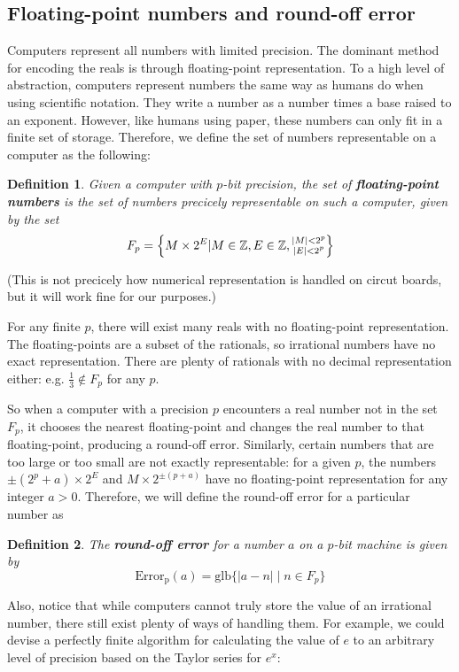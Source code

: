 \documentclass{article}
\newtheorem{definition}{Definition}[section]
\newcommand{\Z}{\mathbb{Z}}
\newcommand{\0}{\vb{0}}
\begin{document}
\subsection{Floating-point numbers and round-off error}

Computers represent all numbers with limited precision. The dominant method for encoding the reals is through floating-point representation. To a high level of abstraction, computers represent numbers the same way as humans do when using scientific notation. They write a number as a number times a base raised to an exponent. However, like humans using paper, these numbers can only fit in a finite set of storage. Therefore, we define the set of numbers representable on a computer as the following:
\begin{definition}
  Given a computer with $p$-bit precision, the set of \textbf{floating-point numbers} is the set of numbers precicely representable on such a computer, given by the set
  \[F_p = \qty{M\times 2^E | M \in \Z, E \in \Z, \substack{|M| < 2^p \\ |E| < 2^p}}\]
\end{definition}
(This is not precicely how numerical representation is handled on circut boards, but it will work fine for our purposes.)

For any finite $p$, there will exist many reals with no floating-point representation. The floating-points are a subset of the rationals, so irrational numbers have no exact representation. There are plenty of rationals with no decimal representation either: e.g. $\frac{1}{3} \not\in F_p$ for any $p$. 

So when a computer with a precision $p$ encounters a real number not in the set $F_p$, it chooses the nearest floating-point and changes the real number to that floating-point, producing a round-off error. Similarly, certain numbers that are too large or too small are not exactly representable: for a given $p$, the numbers $\pm(2^p+a)\times 2^E$ and $M\times 2^{\pm(p+a)}$ have no floating-point representation for any integer $a > 0$. Therefore, we will define the round-off error for a particular number as

\begin{definition}
  The \textbf{round-off error} for a number $a$ on a $p$-bit machine is given by
  \[\mathrm{Error_p}(a) = \mathrm{glb}\{|a - n| \mid n \in F_p\}\]
\end{definition}

Also, notice that while computers cannot truly store the value of an irrational number, there still exist plenty of ways of handling them. For example, we could devise a perfectly finite algorithm for calculating the value of $e$ to an arbitrary level of precision based on the Taylor series for $e^x$:
\end{document}

